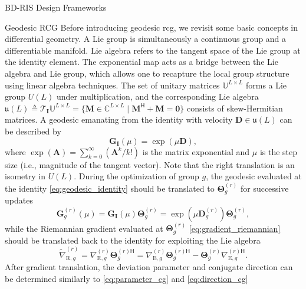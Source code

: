 \begin{section}{BD-RIS Design Frameworks}
\begin{subsection}{Geodesic RCG}
	Before introducing geodesic \gls{rcg}, we revisit some basic concepts in differential geometry.
	A Lie group is simultaneously a continuous group and a differentiable manifold.
	Lie algebra refers to the tangent space of the Lie group at the identity element.
	The exponential map acts as a bridge between the Lie algebra and Lie group, which allows one to recapture the local group structure using linear algebra techniques.
	The set of unitary matrices $\mathbb{U}^{L \times L}$ forms a Lie group $U(L)$ under multiplication, and the corresponding Lie algebra $\mathfrak{u}(L) \triangleq \mathcal{T}_{\mathbf{I}}\mathbb{U}^{L \times L} = \{\mathbf{M} \in \mathbb{C}^{L \times L} \mid \mathbf{M}^\mathsf{H} + \mathbf{M} = \mathbf{0}\}$ consists of skew-Hermitian matrices.
	A geodesic emanating from the identity with velocity $\mathbf{D} \in \mathfrak{u}(L)$ can be described by \cite{Edelman1998}
	\begin{equation}
		\mathbf{G}_\mathbf{I}(\mu) = \exp(\mu \mathbf{D}),
		\label{eq:geodesic_identity}
	\end{equation}
	where $\exp(\mathbf{A}) = \sum_{k=0}^\infty (\mathbf{A}^k/k!)$ is the matrix exponential and $\mu$ is the step size (i.e., magnitude of the tangent vector).
	Note that the right translation is an isometry in $U(L)$.
	During the optimization of group $g$, the geodesic evaluated at the identity \eqref{eq:geodesic_identity} should be translated to $\mathbf{\Theta}_g^{(r)}$ for successive updates \cite{Abrudan2008}
	\begin{equation}
		\mathbf{G}_g^{(r)}(\mu) = \mathbf{G}_\mathbf{I}(\mu) \mathbf{\Theta}_g^{(r)} = \exp(\mu \mathbf{D}_g^{(r)}) \mathbf{\Theta}_g^{(r)},
		\label{eq:geodesic_translated}
	\end{equation}
	while the Riemannian gradient evaluated at $\mathbf{\Theta}_g^{(r)}$ \eqref{eq:gradient_riemannian} should be translated back to the identity for exploiting the Lie algebra \cite{Abrudan2008}
	\begin{equation}
		\tilde{\nabla}_{\mathrm{R},g}^{(r)} = \nabla_{\mathrm{R},g}^{(r)} \mathbf{\Theta}_g^{(r)\mathsf{H}} = \nabla_{\mathrm{E},g}^{(r)} \mathbf{\Theta}_g^{(r)\mathsf{H}} - \mathbf{\Theta}_g^{(r)} {\nabla_{\mathrm{E},g}^{(r)\mathsf{H}}}.
		\label{eq:gradient_translated}
	\end{equation}
	After gradient translation, the deviation parameter and conjugate direction can be determined similarly to \eqref{eq:parameter_cg} and \eqref{eq:direction_cg}

\end{subsection}
\end{section}
